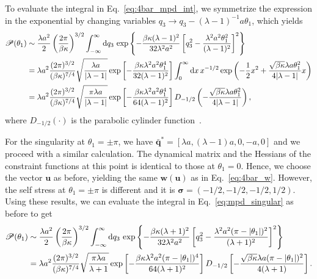 To evaluate the integral in Eq.~\eqref{eq:4bar_mpd_int}, we symmetrize the expression in the exponential by changing variables $q_3 \to q_3 - (\lambda-1)^{-1}a\theta_1$, which yields
%
\begin{equation}
  \begin{aligned}
    \mathscr{P}(\theta_1) &\sim \frac{\lambda a^2}{2}\left(\frac{2\pi}{\beta\kappa}\right)^{3/2}\int_{-\infty}^{\infty} \mathrm{d} q_3\, \exp\left\{-\frac{\beta\kappa(\lambda-1)^2}{32\lambda^2 a^2}\left[q_3^2 - \frac{\lambda^2 a^2\theta_1^2}{(\lambda-1)^2}\right]^2\right\}\\
                                           &= \lambda a^2\frac{(2\pi)^{3/2}}{(\beta\kappa)^{7/4}}\sqrt{\frac{\lambda{a}}{\lvert\lambda-1\rvert}}\exp\left[-\frac{\beta\kappa\lambda^2a^2\theta_1^4}{32(\lambda-1)^2}\right]\int_{0}^{\infty} \mathrm{d} x\, x^{-1/2}\exp\left(-\frac{1}{2}x^2 + \frac{\sqrt{\beta\kappa}\lambda a\theta_1^2}{4\lvert\lambda-1\rvert}x\right)\\
                                           &= \lambda a^2\frac{(2\pi)^{3/2}}{(\beta\kappa)^{7/4}}\sqrt{\frac{\pi\lambda{a}}{\lvert\lambda-1\rvert}}\exp\left[-\frac{\beta\kappa\lambda^2a^2\theta_1^4}{64(\lambda-1)^2}\right]D_{-1/2}\left(-\frac{\sqrt{\beta\kappa}\lambda a\theta_1^2}{4\lvert\lambda-1\rvert}\right),
  \end{aligned}
  \label{eq:4bar_0}
\end{equation}
%
where $D_{-1/2}(\cdot)$ is the parabolic cylinder function~\cite{olver2010}.

For the singularity at $\theta_{1} = \pm\pi$, we have $\bar{\bm{q}}^{*} = [\lambda a, (\lambda-1)a, 0, -a, 0]$ and we proceed with a similar calculation.
The dynamical matrix and the Hessians of the constraint functions at this point is identical to those at $\theta_{1} = 0$.
Hence, we choose the vector $\bm{u}$ as before, yielding the same $\bm{w}(\bm{u})$ as in Eq.~\eqref{eq:4bar_w}.
However, the self stress at $\theta_1 = \pm\pi$ is different and it is $\bm{\sigma} = \left(-1/2, -1/2, -1/2, 1/2\right)$.
Using these results, we can evaluate the integral in Eq.~\eqref{eq:mpd_singular} as before to get
%
\begin{equation}
  \begin{aligned}
    \mathscr{P}(\theta_1) &\sim \frac{\lambda a^2}{2}\left(\frac{2\pi}{\beta\kappa}\right)^{3/2}\int_{-\infty}^{\infty} \mathrm{d}{q}_3\, \exp\left\{-\frac{\beta\kappa(\lambda+1)^2}{32\lambda^2 a^2}\left[q_3^2 - \frac{\lambda^2 a^2(\pi-\lvert\theta_1\rvert)^2}{(\lambda+1)^2}\right]^2\right\}\\
                                           &= \lambda a^2\frac{(2\pi)^{3/2}}{(\beta\kappa)^{7/4}}\sqrt{\frac{\pi\lambda{a}}{\lambda+1}}\exp\left[-\frac{\beta\kappa\lambda^2a^2(\pi-\lvert\theta_1\rvert)^4}{64(\lambda+1)^2}\right]D_{-1/2}\left[-\frac{\sqrt{\beta\kappa}\lambda a(\pi-\lvert\theta_1\rvert)^2}{4(\lambda+1)}\right].
  \end{aligned}
  \label{eq:4bar_pi}
\end{equation}

